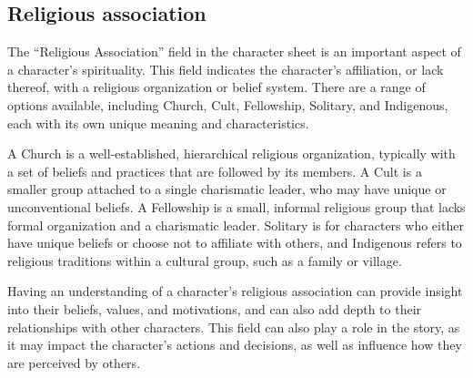 \hypertarget{religious-association}{%
\subsection{Religious association}\label{religious-association}}

The ``Religious Association'' field in the character sheet is an
important aspect of a character's spirituality. This field indicates the
character's affiliation, or lack thereof, with a religious organization
or belief system. There are a range of options available, including
Church, Cult, Fellowship, Solitary, and Indigenous, each with its own
unique meaning and characteristics.

A Church is a well-established, hierarchical religious organization,
typically with a set of beliefs and practices that are followed by its
members. A Cult is a smaller group attached to a single charismatic
leader, who may have unique or unconventional beliefs. A Fellowship is a
small, informal religious group that lacks formal organization and a
charismatic leader. Solitary is for characters who either have unique
beliefs or choose not to affiliate with others, and Indigenous refers to
religious traditions within a cultural group, such as a family or
village.

Having an understanding of a character's religious association can
provide insight into their beliefs, values, and motivations, and can
also add depth to their relationships with other characters. This field
can also play a role in the story, as it may impact the character's
actions and decisions, as well as influence how they are perceived by
others.

